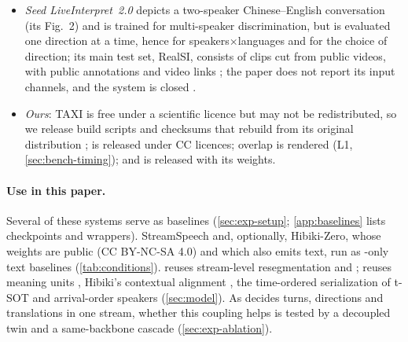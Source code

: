 \begin{itemize}
  \item \emph{Seed LiveInterpret~2.0} depicts a two-speaker Chinese--English conversation (its Fig.~2) and is trained for multi-speaker discrimination, but is evaluated one direction at a time, hence \pmark{} for speakers$\times$languages and for the choice of direction; its main test set, RealSI, consists of clips cut from public videos, with public annotations and video links \citep{cheng2024towards}; the paper does not report its input channels, and the system is closed \citep{cheng2025seed}.
  \item \emph{Ours}: TAXI is free under a scientific licence but may not be redistributed, so we release build scripts and checksums that rebuild \taxi from its original distribution \citep{bas2001taxi,reichel2016bas}; \syn is released under CC licences; overlap is rendered (L1, \cref{sec:bench-timing}); and \model is released with its weights.
\end{itemize}

\paragraph{Use in this paper.}
Several of these systems serve as baselines (\cref{sec:exp-setup}; \cref{app:baselines} lists checkpoints and wrappers). StreamSpeech and, optionally, Hibiki-Zero, whose weights are public (CC BY-NC-SA 4.0) and which also emits text, run as \deen-only text baselines (\cref{tab:conditions}). \scorer reuses stream-level resegmentation and \laal \citep{papi2024streamatt}; \model reuses meaning units \citep{zhang2020learning}, Hibiki's contextual alignment \citep{labiausse2025highfidelity}, the time-ordered serialization of t-SOT \citep{kanda2022streaming} and arrival-order speakers \citep{park2025sortformer} (\cref{sec:model}). As \model decides turns, directions and translations in one stream, whether this coupling helps is tested by a decoupled twin and a same-backbone cascade (\cref{sec:exp-ablation}).
